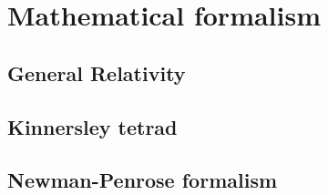 
\chapter{Mathematical formalism} %
\label{Chapter2}


\section{General Relativity}

\section{Kinnersley tetrad}

\section{Newman-Penrose formalism}


\cleardoublepage